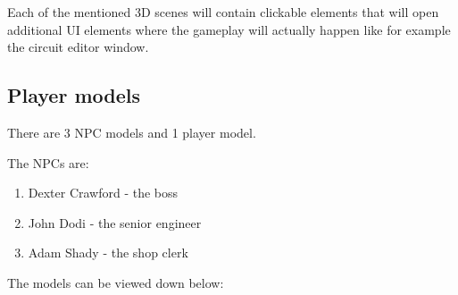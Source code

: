 \documentclass[12pt]{article}
\begin{document}
Each of the mentioned 3D scenes will contain clickable elements that will open additional UI elements where the gameplay will actually happen 
like for example the circuit editor window.
\pagebreak

\subsection{Player models}
There are 3 NPC models and 1 player model.

The NPCs are:

\begin{enumerate}
    \item Dexter Crawford - the boss
    \item John Dodi - the senior engineer
    \item Adam Shady - the shop clerk
\end{enumerate}

The models can be viewed down below:
\end{document}
